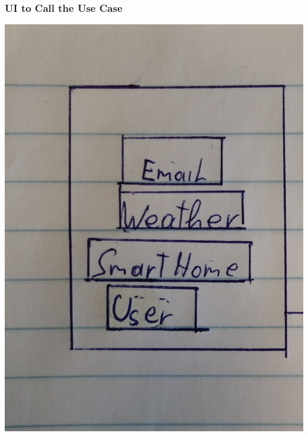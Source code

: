 \documentclass[12pt]{article}
\theoremstyle{definition}
\begin{document}
\subsubsection{UI to Call the Use Case}
\begin{center}
\includegraphics[scale=.1]{UseCase/StandardView.jpg}\\
\end{center}
\end{document}
